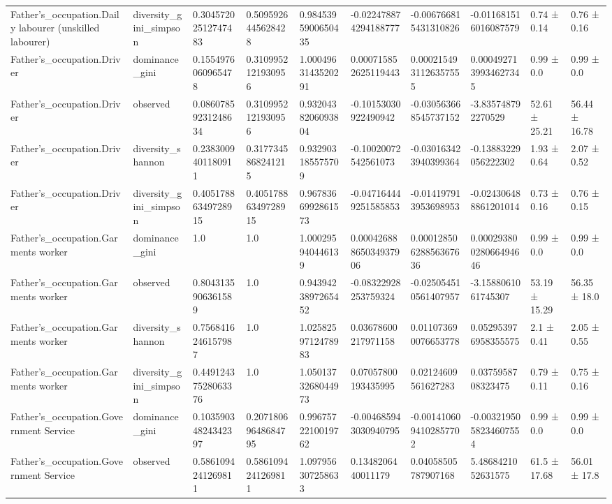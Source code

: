 \begin{longtable}{llllllllll}
Father’s\_occupation.Daily labourer (unskilled labourer) & diversity\_gini\_simpson & 0.30457202512747483 & 0.5095926445628428 & 0.9845395900650435 & -0.022478874294188777 & -0.006766815431310826 & -0.011681516016087579 & 0.74 ± 0.14 & 0.76 ± 0.16 \\
Father’s\_occupation.Driver & dominance\_gini & 0.1554976060965478 & 0.3109952121930956 & 1.0004963143520291 & 0.000715852625119443 & 0.0002154931126357555 & 0.0004927139934627345 & 0.99 ± 0.0 & 0.99 ± 0.0 \\
Father’s\_occupation.Driver & observed & 0.08607859231248634 & 0.3109952121930956 & 0.9320438206093804 & -0.10153030922490942 & -0.030563668545737152 & -3.835748792270529 & 52.61 ± 25.21 & 56.44 ± 16.78 \\
Father’s\_occupation.Driver & diversity\_shannon & 0.2383009401180911 & 0.3177345868241215 & 0.932903185575709 & -0.10020072542561073 & -0.030163423940399364 & -0.13883229056222302 & 1.93 ± 0.64 & 2.07 ± 0.52 \\
Father’s\_occupation.Driver & diversity\_gini\_simpson & 0.40517886349728915 & 0.40517886349728915 & 0.9678366992861573 & -0.047164449251585853 & -0.014197913953698953 & -0.024306488861201014 & 0.73 ± 0.16 & 0.76 ± 0.15 \\
Father’s\_occupation.Garments worker & dominance\_gini & 1.0 & 1.0 & 1.000295940446139 & 0.00042688865034937906 & 0.00012850628856367636 & 0.00029380028066494646 & 0.99 ± 0.0 & 0.99 ± 0.0 \\
Father’s\_occupation.Garments worker & observed & 0.8043135906361589 & 1.0 & 0.9439423897265452 & -0.08322928253759324 & -0.025054510561407957 & -3.1588061061745307 & 53.19 ± 15.29 & 56.35 ± 18.0 \\
Father’s\_occupation.Garments worker & diversity\_shannon & 0.7568416246157987 & 1.0 & 1.0258259712478983 & 0.03678600217971158 & 0.011073690076653778 & 0.052953976958355575 & 2.1 ± 0.41 & 2.05 ± 0.55 \\
Father’s\_occupation.Garments worker & diversity\_gini\_simpson & 0.44912437528063376 & 1.0 & 1.0501373268044973 & 0.07057800193435995 & 0.02124609561627283 & 0.0375958708323475 & 0.79 ± 0.11 & 0.75 ± 0.16 \\
Father’s\_occupation.Government Service & dominance\_gini & 0.10359034824342397 & 0.20718069648684795 & 0.9967572210019762 & -0.004685943030940795 & -0.0014106094102857702 & -0.0032195058234607554 & 0.99 ± 0.0 & 0.99 ± 0.0 \\
Father’s\_occupation.Government Service & observed & 0.5861094241269811 & 0.5861094241269811 & 1.097956307258633 & 0.1348206440011179 & 0.04058505787907168 & 5.4868421052631575 & 61.5 ± 17.68 & 56.01 ± 17.8 \\

\end{longtable}
